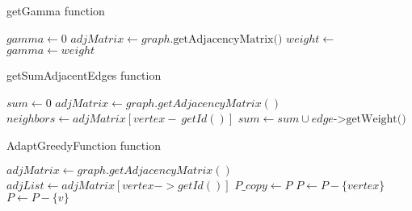\begin{algorithm}[H]
    \caption{getGamma function}
    \label{getGamma-pseudocode}
    \begin{algorithmic}[1]
            \State $gamma \gets $0
            \State $adjMatrix \gets graph.\text{getAdjacencyMatrix()}$
                \State $weight \gets $
                    \State $gamma \gets weight$
                \EndIf
            \EndFor
            \State {}
        \EndProcedure
    \end{algorithmic}
\end{algorithm}

\begin{algorithm}[H]
    \caption{getSumAdjacentEdges function}
    \label{getSumAdjacentEdges-pseudocode}
    \begin{algorithmic}[1]
            \State $sum \gets 0$
            \State $adjMatrix \gets graph.getAdjacencyMatrix()$
            \State $neighbors \gets adjMatrix[vertex-\>getId()]$
                \State $sum \gets sum \cup edge\text{->getWeight()}$
            \EndFor
            \State {}
        \EndProcedure
    \end{algorithmic}
\end{algorithm}

\begin{algorithm}[H]
    \caption{AdaptGreedyFunction function}
    \label{AdaptGreedyFunction-pseudocode}
    \begin{algorithmic}[1]
            \State $adjMatrix \gets graph.getAdjacencyMatrix()$
            \State $adjList \gets adjMatrix[vertex->getId()]$
            \State $P\_copy \gets P$
            \State $P \gets P - \lbrace vertex \rbrace$
                    \State $P \gets P - \lbrace v \rbrace$
                \EndIf
            \EndFor
        \EndProcedure
    \end{algorithmic}
\end{algorithm}

